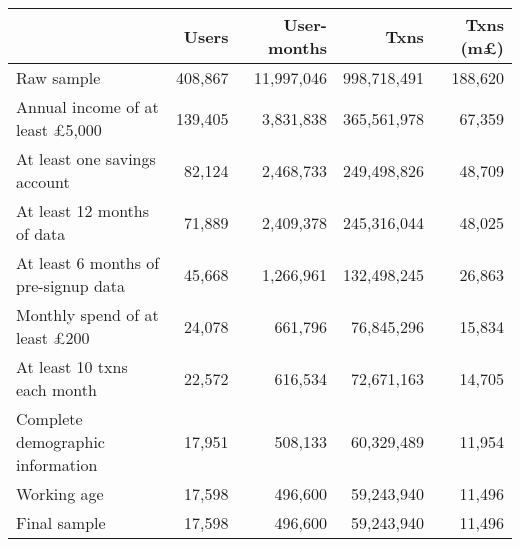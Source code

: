 \begin{tabular}{lrrrr}
\toprule
                                       &   Users & User-months &        Txns & Txns (m\pounds) \\
\midrule
                            Raw sample & 408,867 &  11,997,046 & 998,718,491 &         188,620 \\
Annual income of at least \pounds5,000 & 139,405 &   3,831,838 & 365,561,978 &          67,359 \\
          At least one savings account &  82,124 &   2,468,733 & 249,498,826 &          48,709 \\
            At least 12 months of data &  71,889 &   2,409,378 & 245,316,044 &          48,025 \\
  At least 6 months of pre-signup data &  45,668 &   1,266,961 & 132,498,245 &          26,863 \\
  Monthly spend of at least \pounds200 &  24,078 &     661,796 &  76,845,296 &          15,834 \\
           At least 10 txns each month &  22,572 &     616,534 &  72,671,163 &          14,705 \\
      Complete demographic information &  17,951 &     508,133 &  60,329,489 &          11,954 \\
                           Working age &  17,598 &     496,600 &  59,243,940 &          11,496 \\
                          Final sample &  17,598 &     496,600 &  59,243,940 &          11,496 \\
\bottomrule
\end{tabular}

